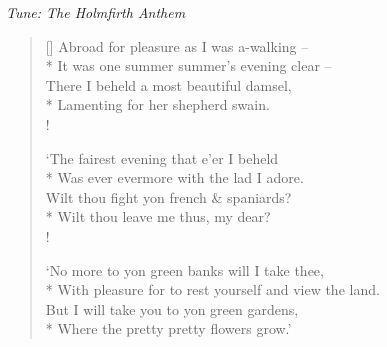 \documentclass[MAIN]{subfiles}
\begin{document}
\bigskip

\begin{center}
{\it Tune: The Holmfirth Anthem}
\end{center}

\bigskip

\settowidth{\versewidth}{It was one summer summer's evening clear}
\begin{verse}[\versewidth]
Abroad for pleasure as I was a-walking --\\*
It was one summer summer's evening clear --\\
There I beheld a most beautiful damsel,\\*
Lamenting for her shepherd swain.\\!

`The fairest evening that e'er I beheld\\*
Was ever evermore with the lad I adore.\\
Wilt thou fight yon french \& spaniards?\\*
Wilt thou leave me thus, my dear?\\!

`No more to yon green banks will I take thee,\\*
With pleasure for to rest yourself and view the land.\\
But I will take you to yon green gardens,\\*
Where the pretty pretty flowers grow.'
\end{verse}
\end{document}

